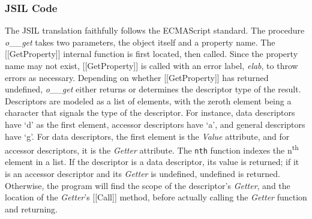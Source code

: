 \documentclass[a4paper,11pt,twoside]{report}
\begin{document}

\subsubsection{JSIL Code}
The JSIL translation faithfully follows the ECMAScript standard. The procedure \textit{o}\_\_\textit{get} takes two parameters, the object itself and a property name. The [[GetProperty]] internal function is first located, then called. Since the property name may not exist, [[GetProperty]] is called with an error label, \textit{elab}, to throw errors as necessary. Depending on whether [[GetProperty]] has returned undefined, \textit{o}\_\_\textit{get} either returns or determines the descriptor type of the result. Descriptors are modeled as a list of elements, with the zeroth element being a character that signals the type of the descriptor. For instance, data descriptors have `d' as the first element, accessor descriptors have `a', and general descriptors have `g'. For data descriptors, the first element is the \textit{Value} attribute, and for accessor descriptors, it is the \textit{Getter} attribute. The \texttt{nth} function indexes the n\textsuperscript{th} element in a list. If the descriptor is a data descriptor, its value is returned; if it is an accessor descriptor and its \textit{Getter} is undefined, undefined is returned. Otherwise, the program will find the scope of the descriptor's \textit{Getter}, and the location of the \textit{Getter}'s [[Call]] method, before actually calling the \textit{Getter} function and returning.
\end{document}
